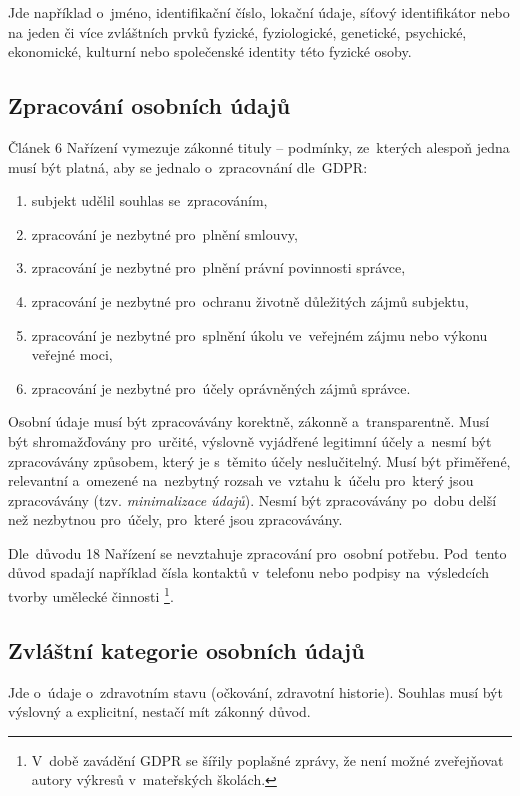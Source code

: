 Jde například o~jméno, identifikační číslo, lokační údaje, síťový identifikátor nebo na jeden či více zvláštních prvků fyzické, fyziologické, genetické, psychické, ekonomické, kulturní nebo společenské identity této fyzické osoby.

\subsection{Zpracování osobních údajů}

Článek 6 Nařízení vymezuje zákonné tituly -- podmínky, ze~kterých alespoň jedna musí být platná, aby se jednalo o~zpracovnání dle~GDPR:

\begin{enumerate}[label=\alph*)]
\item subjekt udělil souhlas se~zpracováním,
\item zpracování je nezbytné pro~plnění smlouvy,
\item zpracování je nezbytné pro~plnění právní povinnosti správce,
\item zpracování je nezbytné pro~ochranu životně důležitých zájmů subjektu,
\item zpracování je nezbytné pro~splnění úkolu ve~veřejném zájmu nebo výkonu veřejné moci,
\item zpracování je nezbytné pro~účely oprávněných zájmů správce.
\end{enumerate}

Osobní údaje musí být zpracovávány korektně, zákonně a~transparentně.
Musí být shromažďovány pro~určité, výslovně vyjádřené legitimní účely a~nesmí být zpracovávány způsobem, který je s~těmito účely neslučitelný.
Musí být přiměřené, relevantní a~omezené na~nezbytný rozsah ve~vztahu k~účelu pro~který jsou zpracovávány (tzv. \emph{minimalizace údajů}).
Nesmí být zpracovávány po~dobu delší než nezbytnou pro~účely, pro~které jsou zpracovávány.

Dle~důvodu 18 Nařízení se nevztahuje zpracování pro~osobní potřebu.
Pod~tento důvod spadají například čísla kontaktů v~telefonu nebo podpisy na~výsledcích tvorby umělecké činnosti%
\footnote{V~době zavádění GDPR se šířily poplašné zprávy, že není možné zveřejňovat autory výkresů v~mateřských školách.}.

\subsection{Zvláštní kategorie osobních údajů}

Jde o~údaje o~zdravotním stavu (očkování, zdravotní historie).
Souhlas musí být výslovný a explicitní, nestačí mít zákonný důvod.

